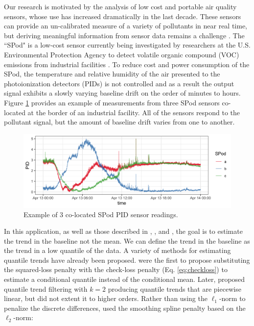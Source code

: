 \documentclass[12pt]{article}
\begin{document}
	
	Our research is motivated by the analysis of low cost and portable air quality sensors, whose use has increased dramatically in the last decade. These sensors can provide an un-calibrated measure of a variety of pollutants in near real time, but deriving meaningful information from sensor data remains a challenge \citep{snyder2013changing}. The ``SPod" is a low-cost sensor currently being investigated by researchers at the U.S. Environmental Protection Agency to detect volatile organic compound (VOC) emissions from industrial facilities \citep{thoma2016south}. To reduce cost and power consumption of the SPod, the temperature and relative humidity of the air presented to the photoionization detectors (PIDs) is not controlled and as a result the output signal exhibits a slowly varying baseline drift on the order of minutes to hours. Figure \ref{fig:raw_spod} provides an example of measurements from three SPod sensors co-located at the border of an industrial facility. All of the sensors respond to the pollutant signal, but the amount of baseline drift varies from one to another.
	\begin{figure}[t!]
		\includegraphics[width = \linewidth]{Figures/uncorrected_data.png}		
		\caption{Example of 3 co-located SPod PID sensor readings.}
		\label{fig:raw_spod}
	\end{figure}	

	In this application, as well as those described in \cite{Ning2014}, \cite{marandi2015qualitative}, and \cite{pettersson2013algorithm}, the goal is to estimate the trend in the baseline not the mean. We can define the trend in the baseline as the trend in a low quantile of the data. A variety of methods for estimating quantile trends have already been proposed. \cite{Koenker1978} were the first to propose substituting the squared-loss penalty with the check-loss penalty (Eq. \ref{eq:checkloss}) to estimate a conditional quantile instead of the conditional mean. Later, \cite{KoenkerNgPortnoy1994} proposed quantile trend filtering with $k = 2$ producing quantile trends that are piecewise linear, but did not extent it to higher orders. Rather than using the $\ell_1$-norm to penalize the discrete differences, \cite{nychka1995nonparametric} used the smoothing spline penalty based on the $\ell_2$-norm: 
	
\end{document}

